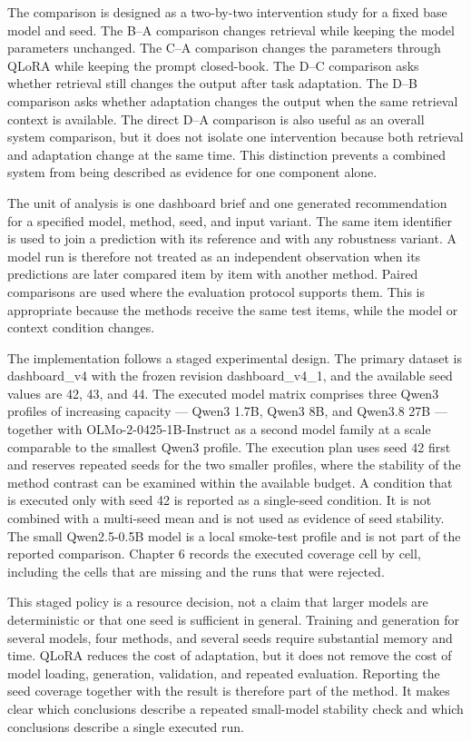 The comparison is designed as a two-by-two intervention study for a fixed base model and seed. The B--A comparison changes retrieval while keeping the model parameters unchanged. The C--A comparison changes the parameters through QLoRA while keeping the prompt closed-book. The D--C comparison asks whether retrieval still changes the output after task adaptation. The D--B comparison asks whether adaptation changes the output when the same retrieval context is available. The direct D--A comparison is also useful as an overall system comparison, but it does not isolate one intervention because both retrieval and adaptation change at the same time. This distinction prevents a combined system from being described as evidence for one component alone.

The unit of analysis is one dashboard brief and one generated recommendation for a specified model, method, seed, and input variant. The same item identifier is used to join a prediction with its reference and with any robustness variant. A model run is therefore not treated as an independent observation when its predictions are later compared item by item with another method. Paired comparisons are used where the evaluation protocol supports them. This is appropriate because the methods receive the same test items, while the model or context condition changes.

The implementation follows a staged experimental design. The primary dataset is dashboard\_v4 with the frozen revision dashboard\_v4\_1, and the available seed values are 42, 43, and 44. The executed model matrix comprises three Qwen3 profiles of increasing capacity --- Qwen3 1.7B, Qwen3 8B, and Qwen3.8 27B --- together with OLMo-2-0425-1B-Instruct as a second model family at a scale comparable to the smallest Qwen3 profile. The execution plan uses seed 42 first and reserves repeated seeds for the two smaller profiles, where the stability of the method contrast can be examined within the available budget. A condition that is executed only with seed 42 is reported as a single-seed condition. It is not combined with a multi-seed mean and is not used as evidence of seed stability. The small Qwen2.5-0.5B model is a local smoke-test profile and is not part of the reported comparison. Chapter 6 records the executed coverage cell by cell, including the cells that are missing and the runs that were rejected.

This staged policy is a resource decision, not a claim that larger models are deterministic or that one seed is sufficient in general. Training and generation for several models, four methods, and several seeds require substantial memory and time. QLoRA reduces the cost of adaptation, but it does not remove the cost of model loading, generation, validation, and repeated evaluation. Reporting the seed coverage together with the result is therefore part of the method. It makes clear which conclusions describe a repeated small-model stability check and which conclusions describe a single executed run.

